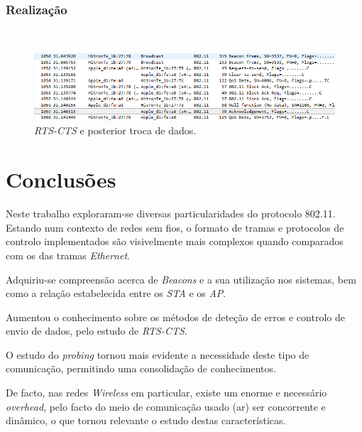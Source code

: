 \documentclass{llncs}
\begin{document}
\subsubsection{Realização}\rule[-10pt]{0pt}{10pt}\\

\begin{figure}
  \begin{center}
  \includegraphics[scale=0.6]{./imagens/p17tramas.png} 
  \end{center}
  \caption{\textit{RTS-CTS} e posterior troca de dados.}
  \label{fig:control_frame}
\end{figure}

\clearpage

\section{Conclusões}

\hspace{5mm} Neste trabalho exploraram-se diversas particularidades do protocolo 802.11. Estando num contexto de redes sem fios, o formato de tramas e protocolos de controlo implementados são visivelmente mais complexos quando comparados com os das tramas \textit{Ethernet}.

Adquiriu-se compreensão acerca de \textit{Beacons} e a sua utilização nos sistemas, bem como a relação estabelecida entre os \textit{STA} e os \textit{AP}.

Aumentou o conhecimento sobre os métodos de deteção de erros e controlo de envio de dados, pelo estudo de \textit{RTS-CTS}.

O estudo do \textit{probing} tornou mais evidente a necessidade deste tipo de comunicação, permitindo uma consolidação de conhecimentos.

De facto, nas redes \textit{Wireless} em particular, existe um enorme e necessário \textit{overhead}, pelo facto do meio de comunicação usado (ar) ser concorrente e dinâmico, o que tornou relevante o estudo destas características.



\end{document}
